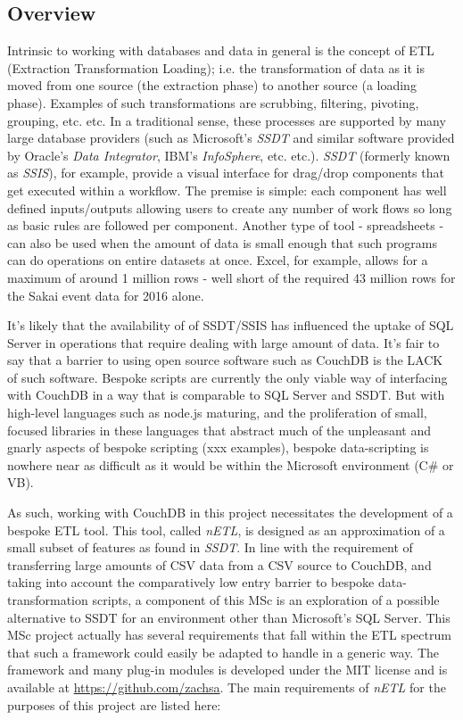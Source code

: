 \subsection{Overview}
Intrinsic to working with databases and data in general is the concept of ETL (Extraction Transformation Loading); i.e. the transformation of data as it is moved from one source (the extraction phase) to another source (a loading phase). Examples of such transformations are scrubbing, filtering, pivoting, grouping, etc. etc. In a traditional sense, these processes are supported by many large database providers (such as Microsoft's \textit{SSDT} and similar software provided by Oracle's \textit{Data Integrator}, IBM's \textit{InfoSphere}, etc. etc.). \textit{SSDT} (formerly known as \textit{SSIS}), for example, provide a visual interface for drag/drop components that get executed within a workflow. The premise is simple: each component has well defined inputs/outputs allowing users to create any number of work flows so long as basic rules are followed per component. Another type of tool - spreadsheets - can also be used when the amount of data is small enough that such programs can do operations on entire datasets at once. Excel, for example, allows for a maximum of around 1 million rows - well short of the required 43 million rows for the Sakai event data for 2016 alone.

It's likely that the availability of of SSDT/SSIS has influenced the uptake of SQL Server in operations that require dealing with large amount of data. It's fair to say that a barrier to using open source software such as CouchDB is the LACK of such software. Bespoke scripts are currently the only viable way of interfacing with CouchDB in a way that is comparable to SQL Server and SSDT. But with high-level languages such as node.js maturing, and the proliferation of small, focused libraries in these languages that abstract much of the unpleasant and gnarly aspects of bespoke scripting (xxx examples), bespoke data-scripting is nowhere near as difficult as it would be within the Microsoft environment (C\# or VB).

As such, working with CouchDB in this project necessitates the development of a bespoke ETL tool. This tool, called \textit{nETL}, is designed as an approximation of a small subset of features as found in \textit{SSDT}. In line with the requirement of transferring large amounts of CSV data from a CSV source to CouchDB, and taking into account the comparatively low entry barrier to bespoke data-transformation scripts, a component of this MSc is an exploration of a possible alternative to SSDT for an environment other than Microsoft's SQL Server. This MSc project actually has several requirements that fall within the ETL spectrum that such a framework could easily be adapted to handle in a generic way. The framework and many plug-in modules is developed under the MIT license and is available at \url{https://github.com/zachsa}. The main requirements of \textit{nETL} for the purposes of this project are listed here:

